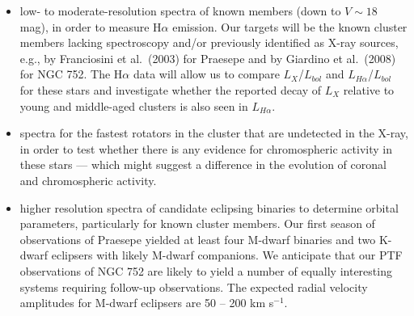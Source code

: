 \begin{itemize}
\vspace{-0.3cm}
\item low- to moderate-resolution spectra of known members (down to $V \sim 18$ mag), in order to measure H$\alpha$ emission. Our targets will be the known cluster members lacking spectroscopy and/or previously identified as X-ray sources, e.g., by Franciosini et al.\ (2003) for Praesepe and by Giardino et al.\ (2008) for NGC 752. The H$\alpha$ data will allow us to compare $L_X$/$L_{bol}$ and $L_{H\alpha}$/$L_{bol}$ for these stars and investigate whether the reported decay of $L_X$ relative to young and middle-aged clusters is also seen in $L_{H\alpha}$. 
\vspace{-0.2cm}
\item spectra for the fastest rotators in the cluster that are undetected in the X-ray, in order to test whether there is any evidence for chromospheric activity in these stars --- which might suggest a difference in the evolution of coronal and chromospheric activity.
\vspace{-0.2cm}
\item higher resolution spectra of candidate eclipsing binaries to determine orbital parameters, particularly for known cluster members. Our first season of observations of Praesepe yielded at least four M-dwarf binaries and two K-dwarf eclipsers with likely M-dwarf companions. We anticipate that our PTF observations of NGC 752 are likely to yield a number of equally interesting systems requiring follow-up observations. The expected radial velocity amplitudes for M-dwarf eclipsers are 50 -- 200 km s$^{-1}$.
\end{itemize}

